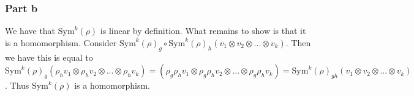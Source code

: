 \documentclass[]{article}
\begin{document}
\subsubsection*{Part b}
We have that $\text{Sym}^k(\rho)$ is linear by definition. What remains to show is that it is a homomorphism. Consider $\text{Sym}^k(\rho)_g \circ \text{Sym}^k(\rho)_h (v_1 \otimes v_2 \otimes ... \otimes v_k)$. Then we have this is equal to $\text{Sym}^k(\rho)_g (\rho_h v_1 \otimes \rho_h v_2 \otimes ... \otimes \rho_h v_k) = (\rho_g \rho_h v_1 \otimes \rho_g \rho_h v_2 \otimes ... \otimes \rho_g \rho_h v_k) = \text{Sym}^k(\rho)_{gh} (v_1 \otimes v_2 \otimes ... \otimes v_k)$. Thus $\text{Sym}^k(\rho)$ is a homomorphism. 
\end{document}
